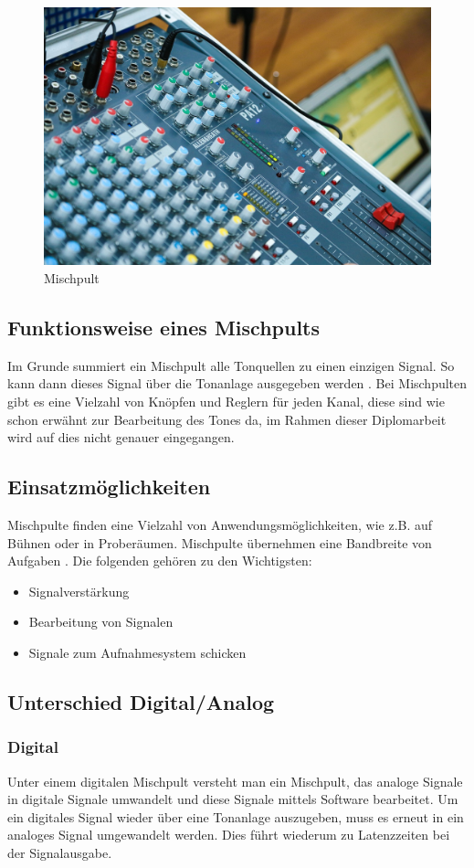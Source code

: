 \begin{figure}[H]
	\centering
	\includegraphics[width=0.6\linewidth]{images/mischpult.jpg}
	\caption[Mischpult]{Mischpult}
	\label{fig:Mischpult}
\end{figure}

\subsection{Funktionsweise eines Mischpults}
Im Grunde summiert ein Mischpult alle Tonquellen zu einen einzigen Signal. So kann dann dieses Signal über die Tonanlage ausgegeben werden \parencite{MischpultErklaerung}. Bei Mischpulten gibt es eine Vielzahl von Knöpfen und Reglern für jeden Kanal, diese sind wie schon erwähnt zur Bearbeitung des Tones da, im Rahmen dieser Diplomarbeit wird auf dies nicht genauer eingegangen. \\


\subsection{Einsatzmöglichkeiten}
Mischpulte finden eine Vielzahl von Anwendungsmöglichkeiten, wie z.B. auf Bühnen oder in Proberäumen. Mischpulte übernehmen eine Bandbreite von Aufgaben \parencite{MischpultVerwendungszweck}. Die folgenden gehören zu den Wichtigsten:
\begin{itemize}
	\item Signalverstärkung
	\item Bearbeitung von Signalen
	\item Signale zum Aufnahmesystem schicken
\end{itemize}


\subsection{Unterschied Digital/Analog}
\subsubsection{Digital}
Unter einem digitalen Mischpult versteht man ein Mischpult, das analoge Signale in digitale Signale umwandelt und diese Signale mittels Software bearbeitet. Um ein digitales Signal wieder über eine Tonanlage auszugeben, muss es erneut in ein analoges Signal umgewandelt werden. Dies führt wiederum zu Latenzzeiten bei der Signalausgabe.
